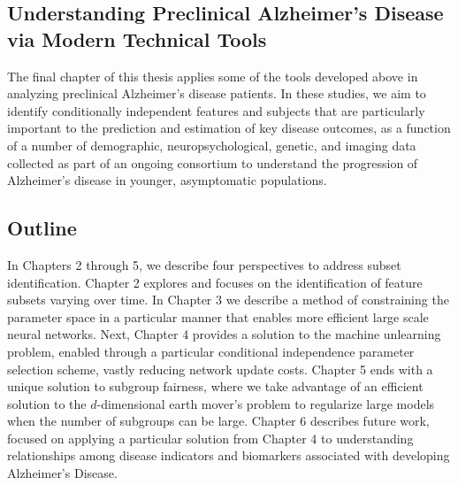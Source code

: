 \subsection{Understanding Preclinical Alzheimer's Disease via Modern Technical Tools}

The final chapter of this thesis applies some of the tools developed above in analyzing preclinical Alzheimer's disease patients. 
In these studies, 
we aim to identify conditionally independent features and subjects that are particularly important to the prediction and estimation of
key disease outcomes,
as a function of a number 
of demographic, neuropsychological,
genetic,
and imaging data collected as 
part of an ongoing consortium 
to understand the progression
of Alzheimer's disease in younger, 
asymptomatic populations.


\subsection{Outline}
In Chapters 2 through 5, we describe four perspectives to address subset identification.
Chapter 2 explores and focuses on the identification of feature subsets varying over time.
In Chapter 3 we describe a method of constraining the parameter space in a particular manner
that enables more efficient large scale neural networks.
Next, Chapter 4 provides a solution to the machine unlearning problem,
enabled through a particular conditional independence parameter selection scheme, vastly reducing network update costs.
Chapter 5 ends with a unique solution to subgroup fairness, 
where we take advantage of an efficient solution to
the $d$-dimensional earth mover's problem
to regularize large models when the number of subgroups can be large.
Chapter 6 describes future work, focused on applying a particular solution from Chapter 4 to understanding relationships among
disease indicators and biomarkers associated with developing Alzheimer's Disease.